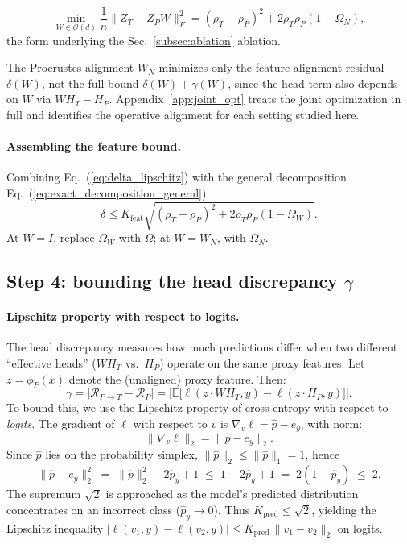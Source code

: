 \begin{equation}
\min_{W \in \mathcal{O}(d)} \frac{1}{n}\|Z_T - Z_P W\|_F^2 = (\rho_T - \rho_P)^2 + 2\rho_T\rho_P(1 - \Omega_N),
\end{equation}
the form underlying the Sec.~\ref{subsec:ablation} ablation.
\begin{remark}
The Procrustes alignment $W_N$ minimizes only the feature alignment residual $\delta(W)$, not the full bound $\delta(W) + \gamma(W)$, since the head term also depends on $W$ via $W H_T - H_P$. Appendix~\ref{app:joint_opt} treats the joint optimization in full and identifies the operative alignment for each setting studied here.
\end{remark}

\paragraph{Assembling the feature bound.}
Combining Eq.~(\ref{eq:delta_lipschitz}) with the general decomposition Eq.~(\ref{eq:exact_decomposition_general}):
\begin{equation}
\label{eq:delta_final}
\delta \le K_{\mathrm{feat}} \sqrt{(\rho_T - \rho_P)^2 + 2\rho_T\rho_P(1 - \Omega_W)}.
\end{equation}
At $W = I$, replace $\Omega_W$ with $\Omega$; at $W = W_N$, with $\Omega_N$.



\subsection{Step 4: bounding the head discrepancy $\gamma$}
\label{app:head_bound}

\paragraph{Lipschitz property with respect to logits.}
The head discrepancy measures how much predictions differ when two different ``effective heads'' ($W H_T$ vs.\ $H_P$) operate on the same proxy features. Let $z = \phi_P(x)$ denote the (unaligned) proxy feature. Then:
\begin{equation}
\gamma = \big|\mathcal{R}_{P \to T} - \mathcal{R}_P\big| = \Big|\mathbb{E}\!\big[\ell(z \cdot W H_T, y) - \ell(z \cdot H_P, y)\big]\Big|.
\end{equation}
To bound this, we use the Lipschitz property of cross-entropy with respect to \emph{logits}. The gradient of $\ell$ with respect to $v$ is $\nabla_v \ell = \hat{p} - e_y$, with norm:
\begin{equation}
\|\nabla_v \ell\|_2 = \|\hat{p} - e_y\|_2.
\end{equation}
Since $\hat{p}$ lies on the probability simplex, $\|\hat{p}\|_2 \le \|\hat{p}\|_1 = 1$, hence
\[
\|\hat{p} - e_y\|_2^2 \;=\; \|\hat{p}\|_2^2 - 2\hat{p}_y + 1 \;\le\; 1 - 2\hat{p}_y + 1 \;=\; 2(1 - \hat{p}_y) \;\le\; 2.
\]
The supremum $\sqrt{2}$ is approached as the model's predicted distribution concentrates on an incorrect class ($\hat{p}_y \to 0$). Thus $K_{\mathrm{pred}} \le \sqrt{2}$, yielding the Lipschitz inequality $|\ell(v_1, y) - \ell(v_2, y)| \le K_{\mathrm{pred}}\, \|v_1 - v_2\|_2$ on logits.

